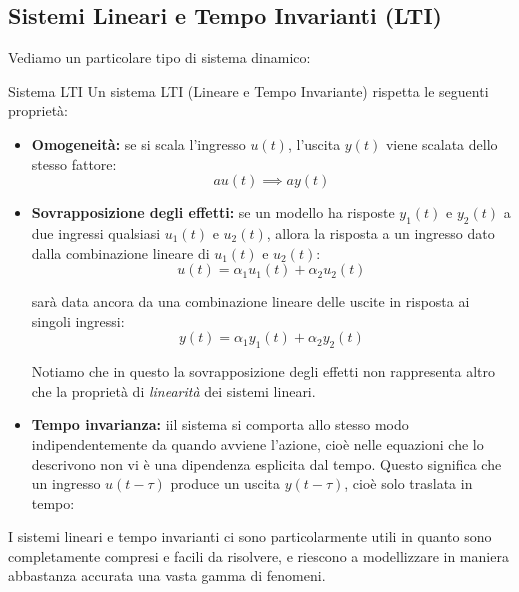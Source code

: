 \documentclass[a4paper,11pt]{article}
\begin{document}
\subsection{Sistemi Lineari e Tempo Invarianti (LTI)}
Vediamo un particolare tipo di sistema dinamico:
\begin{definition}{Sistema LTI}
	Un sistema LTI (Lineare e Tempo Invariante) rispetta le seguenti proprietà:
	\begin{itemize}
		\item \textbf{Omogeneità:} se si scala l'ingresso $u(t)$, l'uscita $y(t)$ viene scalata dello stesso fattore:
			$$
				au(t) \implies ay(t)
			$$

		\item \textbf{Sovrapposizione degli effetti:} se un modello ha risposte $y_1(t)$ e $y_2(t)$ a due ingressi qualsiasi $u_1(t)$ e $u_2(t)$, allora la risposta a un ingresso dato dalla combinazione lineare di $u_1(t)$ e $u_2(t)$:
			$$
				u(t) = \alpha_1 u_1(t) + \alpha_2 u_2(t)
			$$

			sarà data ancora da una combinazione lineare delle uscite in risposta ai singoli ingressi:
			$$
				y(t) = \alpha_1 y_1(t) + \alpha_2 y_2(t)
			$$
			
			Notiamo che in questo la sovrapposizione degli effetti non rappresenta altro che la proprietà di \textit{linearità} dei sistemi lineari.
	
		\item \textbf{Tempo invarianza:} iil sistema si comporta allo stesso modo indipendentemente da quando avviene l'azione, cioè nelle equazioni che lo descrivono non vi è una dipendenza esplicita dal tempo.
			Questo significa che un ingresso $u(t - \tau)$ produce un uscita $y(t - \tau)$, cioè solo traslata in tempo:

		\begin{center}
		\end{center}
	\end{itemize}
\end{definition}

I sistemi lineari e tempo invarianti ci sono particolarmente utili in quanto sono completamente compresi e facili da risolvere, e riescono a modellizzare in maniera abbastanza accurata una vasta gamma di fenomeni.
\end{document}
